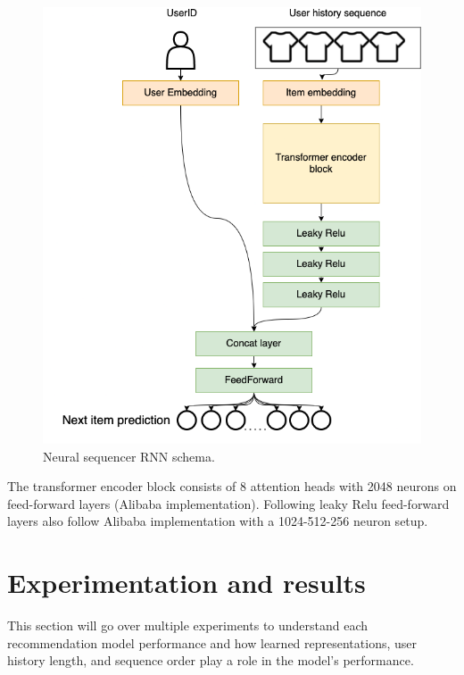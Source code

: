 \documentclass{kththesis}
\begin{document}
\begin{figure}[H]
    \centering
    \includegraphics[scale=0.45]{images/models/Transformer.png}
    \caption{Neural sequencer RNN schema.}
\end{figure}

The transformer encoder block consists of 8 attention heads with 2048 neurons on feed-forward layers (Alibaba implementation). Following leaky Relu feed-forward layers also follow Alibaba implementation with a 1024-512-256 neuron setup.



\chapter{Experimentation and results}\label{results}
This section will go over multiple experiments to understand each recommendation model performance and how learned representations, user history length, and sequence order play a role in the model's performance.
\end{document}
